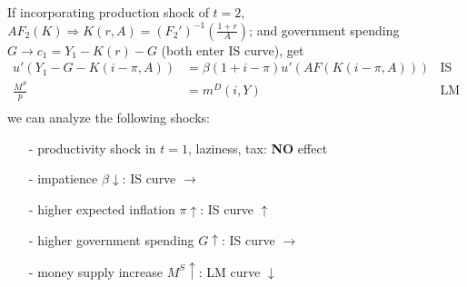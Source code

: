 \documentclass[10pt,landscape,a4paper]{article}
\begin{document}
\begin{multicols*}{3}
If incorporating production shock of $t=2$, $AF_2(K)\Rightarrow K(r,A)=(F_2')^{-1}\left(\frac{1+r}{A}\right)$; and government spending $G\rightarrow c_1=Y_1-K(r)-G$ (both enter IS curve), get 
\begin{align*}
    u'(Y_1-G-K(i-\pi,A)) &= \beta(1+i-\pi)u'(AF(K(i-\pi,A))) & \text{IS}\\
    \frac{M^S}{p} &= m^D(i,Y) & \text{LM}\\
\end{align*}
we can analyze the following shocks:
\begin{itemize}
    \item[-] productivity shock in $t=1$, laziness, tax: \textbf{NO} effect
    \item[-] impatience $\beta \downarrow$: IS curve $\rightarrow$
    \item[-] higher expected inflation $\pi \uparrow$: IS curve $\uparrow$
    \item[-] higher government spending $G\uparrow$: IS curve $\rightarrow$
    \item[-] money supply increase $M^S \uparrow$: LM curve $\downarrow$
\end{itemize}


\end{multicols*}
\end{document}
